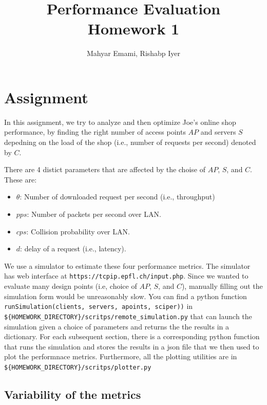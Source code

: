 \documentclass{report}
\title{Performance Evaluation\\Homework 1}
\author{Mahyar Emami, Rishabp Iyer}
\begin{document}
\maketitle

\section{Assignment}

In this assignment, we try to analyze and then optimize Joe's online shop 
performance, by finding the right number of access points $AP$ and servers $S$
depedning on the load of the shop (i.e., number of requests per second) denoted
by $C$.

There are 4 distict parameters that are affected by the choise of $AP$, $S$, and
$C$. These are:
\begin{itemize}
    \item $\theta$: Number of downloaded request per second (i.e., 
    throughput)
    \item $pps$: Number of packets per second over LAN.
    \item $cps$: Collision probability over LAN.
    \item $d$: delay of a request (i.e., latency).
\end{itemize}

We use a simulator to estimate these four performance metrics. The simulator
has web interface at \texttt{https://tcpip.epfl.ch/input.php}. Since we 
wanted to evaluate many design points (i.e, choice of $AP$, $S$, and $C$),
manually filling out the simulation form would be unreasonably slow. 
You can find a python function 
\texttt{runSimulation(clients, servers, apoints, sciper))} in 
\texttt{\$\{HOMEWORK\_DIRECTORY\}/scritps/remote\_simulation.py} 
that can launch the simulation given a choice of parameters and returns the
the results in a dictionary. For each subsequent section, there is a
corresponding python function that runs the simulation and stores the results
in a json file that we then used to plot the performnace metrics. Furthermore,
all the plotting utilities are in 
\texttt{\$\{HOMEWORK\_DIRECTORY\}/scritps/plotter.py} 

\subsection{Variability of the metrics}
\end{document}
